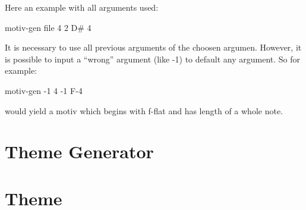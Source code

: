 \documentclass{article}
\begin{document}
Here an example with all arguments used:
\begin{center}
 motiv-gen file 4 2 D\# 4
\end{center}
 It is necessary to use all previous arguments of the choosen argumen. However, it is possible to input a ``wrong'' argument (like -1) to default any argument. So for example:
 \begin{center}
 motiv-gen -1 4 -1 F-4
 \end{center}
 would yield a motiv which begins with f-flat and has length of a whole note.

\section{Theme Generator}
\section{Theme }
\end{document}

